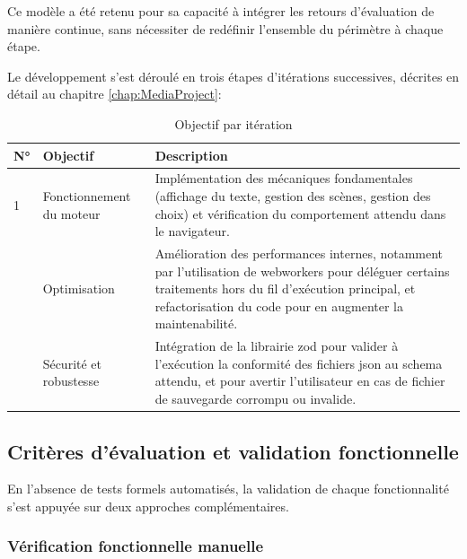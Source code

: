 Ce modèle a été retenu pour sa capacité à intégrer les retours d'évaluation de manière continue, sans nécessiter de redéfinir l'ensemble du périmètre à chaque étape.

\clearpage

Le développement s'est déroulé en trois étapes d'itérations successives, décrites en détail au chapitre \ref{chap:MediaProject}:

\begin{table}[H]
    \centering
    \caption{Objectif par itération}
    \renewcommand{\arraystretch}{1.5}
    \begin{tabular}{p{0.5cm} p{2.7cm} p{9.5cm}}
        \hline
        \textbf{N°} & \textbf{Objectif} & \textbf{Description} \\
        \hline
        1 & Fonctionnement du moteur & Implémentation des mécaniques fondamentales (affichage du texte, gestion des scènes, gestion des choix) et vérification du comportement attendu dans le navigateur. \\
        \addlinespace
        2 & Optimisation & Amélioration des performances internes, notamment par l'utilisation de \glspl{webworker} pour déléguer certains traitements hors du fil d'exécution principal, et refactorisation du code pour en augmenter la maintenabilité. \\
        \addlinespace
        3 & Sécurité et robustesse & Intégration de la \gls{librairie} \gls{zod} pour valider à l'exécution la conformité des fichiers \gls{json} au \gls{schema} attendu, et pour avertir l'utilisateur en cas de fichier de sauvegarde corrompu ou invalide. \\
        \hline
    \end{tabular}
    \label{tab:objectifs_iterations}
\end{table}


\subsection{Critères d'évaluation et validation fonctionnelle}

En l'absence de tests formels automatisés, la validation de chaque fonctionnalité s'est appuyée sur deux approches complémentaires.


\subsubsection{Vérification fonctionnelle manuelle}

